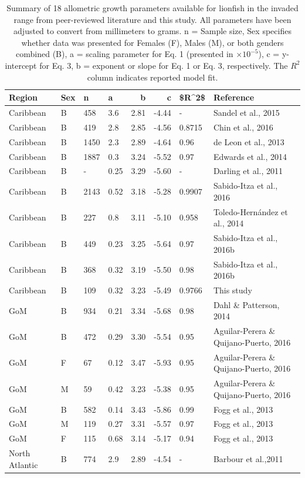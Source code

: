 \documentclass[fleqn,10pt,lineno]{wlpeerj} %
\begin{document}
\begin{table}

\caption{\label{tab:unnamed-chunk-5}\label{tab:all_params}Summary of 18 allometric growth parameters available for lionfish in the invaded range from peer-reviewed literature and this study. All parameters have been adjusted to convert from millimeters to grams. n = Sample size, Sex specifies whether data was presented for Females (F), Males (M), or both genders combined (B), a = scaling parameter for Eq. 1 (presented in $\times 10^{-5}$), c = y-intercept for Eq. 3, b = exponent or slope for Eq. 1 or Eq. 3, respectively. The $R^2$ column indicates reported model fit.}
\centering
\begin{tabular}[t]{llllrrll}
\toprule
Region & Sex & n & a & b & c & \$R\textasciicircum{}2\$ & Reference\\
\midrule
Caribbean & B & 458 & 3.6 & 2.81 & -4.44 & - & Sandel et al., 2015\\
Caribbean & B & 419 & 2.8 & 2.85 & -4.56 & 0.8715 & Chin et al., 2016\\
Caribbean & B & 1450 & 2.3 & 2.89 & -4.64 & 0.96 & de Leon et al., 2013\\
Caribbean & B & 1887 & 0.3 & 3.24 & -5.52 & 0.97 & Edwards et al., 2014\\
Caribbean & B & - & 0.25 & 3.29 & -5.60 & - & Darling et al., 2011\\
\addlinespace
Caribbean & B & 2143 & 0.52 & 3.18 & -5.28 & 0.9907 & Sabido-Itza et al., 2016\\
Caribbean & B & 227 & 0.8 & 3.11 & -5.10 & 0.958 & Toledo-Hernández et al., 2014\\
Caribbean & B & 449 & 0.23 & 3.25 & -5.64 & 0.97 & Sabido-Itza et al., 2016b\\
Caribbean & B & 368 & 0.32 & 3.19 & -5.50 & 0.98 & Sabido-Itza et al., 2016b\\
Caribbean & B & 109 & 0.32 & 3.23 & -5.49 & 0.9766 & This study\\
\addlinespace
GoM & B & 934 & 0.21 & 3.34 & -5.68 & 0.98 & Dahl \& Patterson, 2014\\
GoM & B & 472 & 0.29 & 3.30 & -5.54 & 0.95 & Aguilar-Perera \& Quijano-Puerto, 2016\\
GoM & F & 67 & 0.12 & 3.47 & -5.93 & 0.95 & Aguilar-Perera \& Quijano-Puerto, 2016\\
GoM & M & 59 & 0.42 & 3.23 & -5.38 & 0.95 & Aguilar-Perera \& Quijano-Puerto, 2016\\
GoM & B & 582 & 0.14 & 3.43 & -5.86 & 0.99 & Fogg et al., 2013\\
\addlinespace
GoM & M & 119 & 0.27 & 3.31 & -5.57 & 0.97 & Fogg et al., 2013\\
GoM & F & 115 & 0.68 & 3.14 & -5.17 & 0.94 & Fogg et al., 2013\\
North Atlantic & B & 774 & 2.9 & 2.89 & -4.54 & - & Barbour et al.,2011\\
\bottomrule
\end{tabular}
\end{table}
\end{document}
